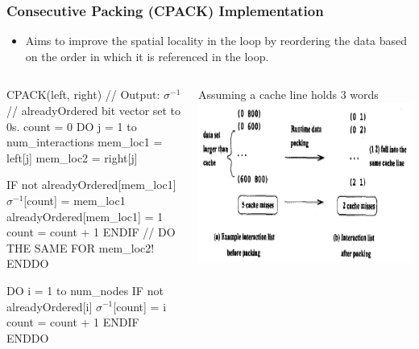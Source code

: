 \documentclass{beamer}
\newcommand{\emphh}[1]{\textcolor{CosGreen}{ #1}}
\newcommand{\mymath}[1]{$ #1 $}
\newcommand{\myindx}[1]{_{#1}}
\newcommand{\myindu}[1]{^{#1}}
\begin{document}
\begin{frame}[fragile,t]
  \frametitle{Consecutive Packing (CPACK) Implementation}

\begin{itemize}
    \item Aims to improve the \emphh{spatial locality} in the loop
            by reordering the data based on the order in which it is
            referenced in the loop.
\end  {itemize}


\begin{columns}
\begin{colorcode}
CPACK(left, right)  // Output: \mymath{\sigma\myindu{-1}}
// alreadyOrdered bit vector set to 0s.
count = 0
DO j = 1 to num_interactions
  mem_loc1 =  left[j]
  mem_loc2 = right[j]
  
  IF not alreadyOrdered[mem_loc1]
    \mymath{\sigma\myindu{-1}}[count] = mem_loc1
    alreadyOrdered[mem_loc1] = 1
    count = count + 1
  ENDIF
  // DO THE SAME FOR mem_loc2!
ENDDO
    
DO i = 1 to num_nodes
  IF not alreadyOrdered[i]
    \mymath{\sigma\myindu{-1}}[count] = i
    count = count + 1
ENDIF ENDDO
\end{colorcode}
Assuming a cache line holds 3 words
\includegraphics[width=35ex]{ParTeaserFigs/CacheMissesEg}
\end{columns}
 

\end{frame}
\end{document}
